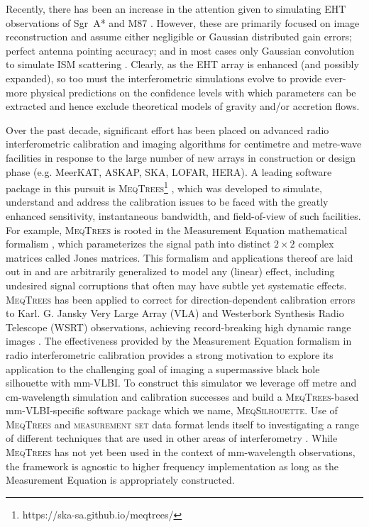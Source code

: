 Recently, there has been an increase in the attention given to simulating EHT observations of Sgr~A*  and M87 \citep{Fish_2014,Lu_2014,Bouman_2015,Lu_2016,Chael_2016}. However, these are primarily focused on image reconstruction and assume either negligible or Gaussian distributed gain errors; perfect antenna pointing accuracy; and in most cases only Gaussian convolution to simulate ISM scattering \citep{Blecher_2016}. Clearly, as the EHT array is enhanced (and possibly expanded), so too must the interferometric simulations evolve to provide ever-more physical predictions on the confidence levels with which parameters can be extracted and hence exclude theoretical models of gravity and/or accretion flows.


Over the past decade, significant effort has been placed on advanced radio interferometric calibration and imaging algorithms for centimetre and metre-wave facilities in response to the large number of new arrays in construction or design phase (e.g. MeerKAT, ASKAP, SKA, LOFAR, HERA). A leading software package in this pursuit is \textsc{MeqTrees}\footnote{https://ska-sa.github.io/meqtrees/} \citep*{Noordam_2010}, which was developed to simulate, understand and address the calibration issues to be faced with the greatly enhanced sensitivity, instantaneous bandwidth, and field-of-view of such facilities. For example, \textsc{MeqTrees} is rooted in the Measurement Equation mathematical formalism \citep{Hamaker_1996}, which parameterizes the signal path into distinct $2 \times 2$ complex  matrices called Jones matrices. This formalism and applications thereof are laid out in \citep{Smirnov_2011a,Smirnov_2011b,Smirnov_2011c} and are arbitrarily generalized to model any (linear) effect, including undesired signal corruptions that often may have subtle yet systematic effects. \textsc{MeqTrees} has been applied to correct for direction-dependent calibration errors to Karl. G. Jansky Very Large Array (VLA) and Westerbork Synthesis Radio Telescope (WSRT) observations, achieving record-breaking high dynamic range images \citep[][Makhathini et al, in prep.]{Smirnov_2011c}. The effectiveness provided by the Measurement Equation formalism in radio interferometric calibration provides a strong motivation to explore its application to the challenging goal of imaging a supermassive black hole silhouette with mm-VLBI. To construct this simulator we leverage off metre and cm-wavelength simulation and calibration successes and build a \textsc{MeqTrees}-based mm-VLBI-specific software package which we name, \textsc{MeqSilhouette}.  Use of \textsc{MeqTrees} and \textsc{measurement set} data format lends itself to investigating a range of different techniques that are used in other areas of interferometry \citep*[e.g.][]{Smirnov_2015}. While \textsc{MeqTrees} has not yet been used in the context of mm-wavelength observations, the framework is agnostic to higher frequency implementation as long as the Measurement Equation is appropriately constructed. 


